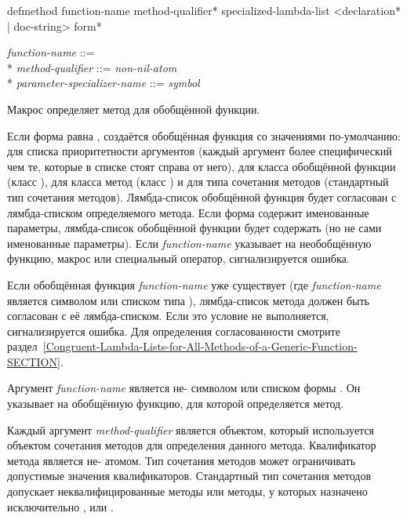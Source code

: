 \begin{defmac}
defmethod function-name {method-qualifier}*
          specialized-lambda-list
          <{declaration}* | doc-string> {form}*

\begin{tabbing}
\emph{function-name} ::=  \\*
\emph{method-qualifier} ::= \emph{non-nil-atom} \\*
\emph{parameter-specializer-name} ::= \emph{symbol} {\Mor} 
\end{tabbing}
Макрос  определяет метод для обобщённой функции.

Если форма  равна , создаётся
обобщённая функция со значениями по-умолчанию: для списка приоритетности
аргументов (каждый аргумент более специфический чем те, которые в списке стоят
справа от него), для класса обобщённой функции (класс
), для класса метод (класс )
и для типа сочетания методов (стандартный тип сочетания методов). Лямбда-список
обобщённой функция будет согласован с лямбда-списком определяемого метода. Если
форма  содержит именованные параметры, лямбда-список обобщённой
функции будет содержать  (но не сами именованные параметры). Если
\emph{function-name} указывает на необобщённую функцию, макрос или специальный
оператор, сигнализируется ошибка.

Если обобщённая функция \emph{function-name} уже существует (где
\emph{function-name} является символом или списком типа ), лямбда-список метода должен быть согласован с её
лямбда-списком. Если это условие не выполняется, сигнализируется
ошибка. Для определения согласованности смотрите
раздел~\ref{Congruent-Lambda-Lists-for-All-Methods-of-a-Generic-Function-SECTION}.

Аргумент \emph{function-name} является не- символом или списком формы
. Он указывает на обобщённую функцию, для которой
определяется метод.

Каждый аргумент \emph{method-qualifier} является объектом, который используется
объектом сочетания методов для определения данного метода. Квалификатор метода
является не- атомом. Тип сочетания методов может
ограничивать допустимые значения квалификаторов. Стандартный тип сочетания
методов допускает неквалифицированные методы или методы, у которых назначено
исключительно ,  или .


\end{defmac}
